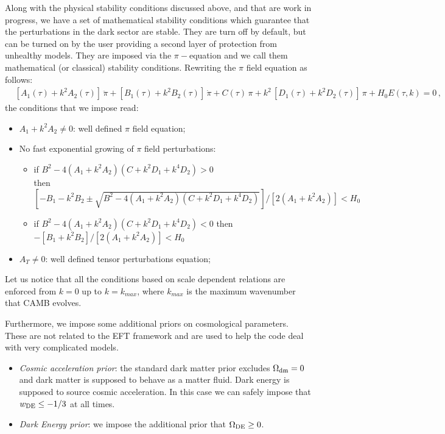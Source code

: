 \documentclass[prd,nofootinbib,showpacs]{revtex4}
\begin{document}
{Along with the physical stability conditions discussed above, and that are work in progress, we have a set of mathematical stability conditions which guarantee that the perturbations in the dark sector are stable. They are turn off by default, but can be turned on by the user providing a second layer of protection from unhealthy models. 
They are imposed via the $\pi-$equation and we call them mathematical (or classical) stability conditions. Rewriting the $\pi$ field equation as follows:
%
\begin{align}
& \left[A_1(\tau) + k^2 A_2(\tau)\right]\,\ddot{\pi} + \left[ B_1(\tau)+ k^2 B_2(\tau)\right]\,\dot{\pi} + C(\tau)\,\pi + k^2\,\left[D_1(\tau) + k^2D_2(\tau) \right]\,\pi + H_0 E(\tau,k) =0   \,,
\end{align}
%
the conditions that we impose read: 
%
\begin{itemize}
\item $A_1 + k^2 A_2 \neq 0$: well defined $\pi$ field equation;
\item No fast exponential growing of $\pi$ field perturbations:
\begin{itemize}
\item if $ B^2 -4(A_1+ k^2 A_2)( C +k^2D_1 + k^4D_2) > 0$ \\ 
then $ \left[ -B_1 - k^2 B_2 \pm \sqrt{B^2 -4(A_1+ k^2 A_2)( C +k^2D_1 + k^4D_2)} \right] / \left[ 2 (A_1 + k^2 A_2) \right] < H_0$
\item if $ B^2 -4(A_1+ k^2 A_2)( C +k^2D_1 + k^4D_2) < 0$ then $ - \left[ B_1 + k^2 B_2\right] / \left[ 2 (A_1 + k^2 A_2) \right] < H_0$  
\end{itemize}
\item $A_T \neq 0$: well defined tensor perturbations equation;
\end{itemize}
%

Let us notice that all the conditions based on scale dependent relations are enforced  from $k=0$ up to $k=k_{max}$, where $k_{max}$ is the maximum wavenumber that CAMB evolves.

Furthermore, we impose some additional priors on cosmological parameters. These are not related to the EFT framework and are used to help the code deal with very complicated models. 
\begin{itemize}
\item {\it Cosmic acceleration prior}:  the standard dark matter prior excludes $\Omega_{\rm dm} = 0$ and dark matter is supposed to behave as a matter fluid. Dark energy is supposed to source cosmic acceleration. In this case we can safely impose that $w_{\rm DE} \leq - 1/3$ at all times.
\item {\it Dark Energy prior}: we impose the additional prior that $\Omega_{\rm DE} \geq 0$.
\end{itemize}

}
\end{document}
